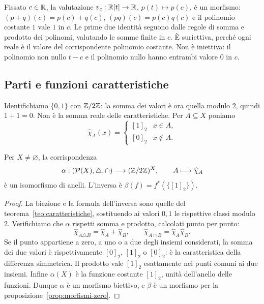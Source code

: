 \begin{esempio}[Valutazione di polinomi]
Fissato $c\in\mathbb{R}$, la valutazione $v_c:\mathbb{R}[t]\to\mathbb{R}$, $p(t)\mapsto p(c)$, è un morfismo: $(p+q)(c)=p(c)+q(c)$, $(pq)(c)=p(c)q(c)$ e il polinomio costante $1$ vale $1$ in $c$. Le prime due identità seguono dalle regole di somma e prodotto dei polinomi, valutando le somme finite in $c$. È suriettiva, perché ogni reale è il valore del corrispondente polinomio costante. Non è iniettiva: il polinomio non nullo $t-c$ e il polinomio nullo hanno entrambi valore $0$ in $c$.
\end{esempio}

\subsection{Parti e funzioni caratteristiche}
Identifichiamo $\{0,1\}$ con $\mathbb{Z}/2\mathbb{Z}$: la somma dei valori è ora quella modulo $2$, quindi $1+1=0$. Non è la somma reale delle caratteristiche. Per $A\subseteq X$ poniamo
\[
\widehat\chi_A(x)=\begin{cases}[1]_2&x\in A,\\{}[0]_2&x\notin A.\end{cases}
\]

\begin{proposizione}
Per $X\ne\varnothing$, la corrispondenza
\[
\alpha:(\mathcal P(X),\triangle,\cap)\longrightarrow(\mathbb{Z}/2\mathbb{Z})^X,
\qquad A\longmapsto\widehat\chi_A
\]
è un isomorfismo di anelli. L'inversa è $\beta(f)=f^*(\{[1]_2\})$.
\end{proposizione}
\begin{proof}
La biezione e la formula dell'inversa sono quelle del teorema~\ref{teo:caratteristiche}, sostituendo ai valori $0,1$ le rispettive classi modulo $2$. Verifichiamo che $\alpha$ rispetti somma e prodotto, calcolati punto per punto:
\[
\widehat\chi_{A\triangle B}=\widehat\chi_A+\widehat\chi_B,
\qquad \widehat\chi_{A\cap B}=\widehat\chi_A\widehat\chi_B.
\]
Se il punto appartiene a zero, a uno o a due degli insiemi considerati, la somma dei due valori è rispettivamente $[0]_2$, $[1]_2$ o $[0]_2$: è la caratteristica della differenza simmetrica. Il prodotto vale $[1]_2$ esattamente nei punti comuni ai due insiemi. Infine $\alpha(X)$ è la funzione costante $[1]_2$, unità dell'anello delle funzioni. Dunque $\alpha$ è un morfismo biettivo, e $\beta$ è un morfismo per la proposizione~\ref{prop:morfismi-zero}.
\end{proof}

